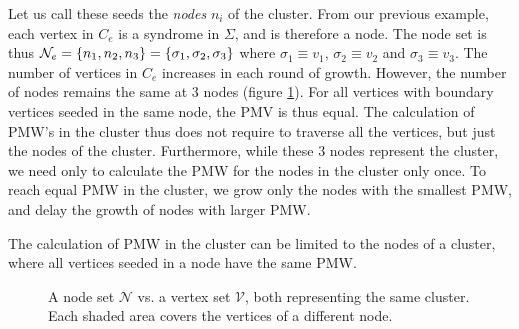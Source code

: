 Let us call these seeds the \emph{nodes} $n_i$ of the cluster. From our previous example, each vertex in $C_e$ is a syndrome in $\Sigma$, and is therefore a node. The node set is thus $\mathcal{N}_e = \{n_1, n_2, n_3\} = \{\sigma_1, \sigma_2, \sigma_3\}$ where $\sigma_1 \equiv v_1$, $\sigma_2 \equiv v_2$ and $\sigma_3 \equiv v_3$. The number of vertices in $C_e$ increases in each round of growth. However, the number of nodes remains the same at 3 nodes (figure \ref{fig:nodesetpmw}). For all vertices with boundary vertices seeded in the same node, the PMV is thus equal. The calculation of PMW's in the cluster thus does not require to traverse all the vertices, but just the nodes of the cluster. Furthermore, while these 3 nodes represent the cluster, we need only to calculate the PMW for the nodes in the cluster only once. To reach equal PMW in the cluster, we grow only the nodes with the smallest PMW, and delay the growth of nodes with larger PMW.

\begin{lemma}
  The calculation of PMW in the cluster can be limited to the nodes of a cluster, where all vertices seeded in a node have the same PMW. 
\end{lemma}

\begin{figure}
 \centering
  \caption{A node set $\mathcal{N}$ vs. a vertex set $\mathcal{V}$, both representing the same cluster. Each shaded area covers the vertices of a different  node.}\label{fig:nodesetpmw}
\end{figure}

